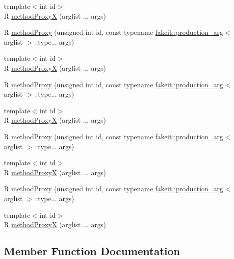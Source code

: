 \begin{DoxyCompactItemize}
\item 
{\footnotesize template$<$int id$>$ }\\R \mbox{\hyperlink{classfakeit_1_1MethodProxyCreator_a5fe41e265c086e63b835a8467b9536ed}{method\+ProxyX}} (arglist ... args)
\item 
R \mbox{\hyperlink{classfakeit_1_1MethodProxyCreator_a84cda851ca570b88485bee657d21f76d}{method\+Proxy}} (unsigned int id, const typename \mbox{\hyperlink{structfakeit_1_1production__arg}{fakeit\+::production\+\_\+arg}}$<$ arglist $>$\+::type... args)
\item 
{\footnotesize template$<$int id$>$ }\\R \mbox{\hyperlink{classfakeit_1_1MethodProxyCreator_a5fe41e265c086e63b835a8467b9536ed}{method\+ProxyX}} (arglist ... args)
\item 
R \mbox{\hyperlink{classfakeit_1_1MethodProxyCreator_a84cda851ca570b88485bee657d21f76d}{method\+Proxy}} (unsigned int id, const typename \mbox{\hyperlink{structfakeit_1_1production__arg}{fakeit\+::production\+\_\+arg}}$<$ arglist $>$\+::type... args)
\item 
{\footnotesize template$<$int id$>$ }\\R \mbox{\hyperlink{classfakeit_1_1MethodProxyCreator_a5fe41e265c086e63b835a8467b9536ed}{method\+ProxyX}} (arglist ... args)
\item 
R \mbox{\hyperlink{classfakeit_1_1MethodProxyCreator_a84cda851ca570b88485bee657d21f76d}{method\+Proxy}} (unsigned int id, const typename \mbox{\hyperlink{structfakeit_1_1production__arg}{fakeit\+::production\+\_\+arg}}$<$ arglist $>$\+::type... args)
\item 
{\footnotesize template$<$int id$>$ }\\R \mbox{\hyperlink{classfakeit_1_1MethodProxyCreator_a5fe41e265c086e63b835a8467b9536ed}{method\+ProxyX}} (arglist ... args)
\item 
R \mbox{\hyperlink{classfakeit_1_1MethodProxyCreator_a84cda851ca570b88485bee657d21f76d}{method\+Proxy}} (unsigned int id, const typename \mbox{\hyperlink{structfakeit_1_1production__arg}{fakeit\+::production\+\_\+arg}}$<$ arglist $>$\+::type... args)
\item 
{\footnotesize template$<$int id$>$ }\\R \mbox{\hyperlink{classfakeit_1_1MethodProxyCreator_a5fe41e265c086e63b835a8467b9536ed}{method\+ProxyX}} (arglist ... args)
\end{DoxyCompactItemize}


\subsection{Member Function Documentation}
\mbox{\label{classfakeit_1_1MethodProxyCreator_abdfdb5f6152dbe98a2e72d2a30ea28dd}} 
